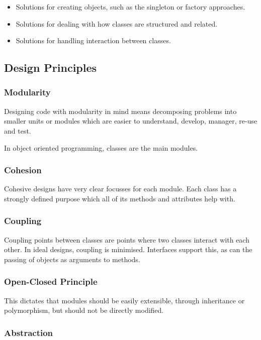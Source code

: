 \documentclass[12pt]{report}
\begin{document}
\begin{flushleft}
\begin{itemize}
    \item Solutions for creating objects, such as the singleton or factory
        approaches.
    \item Solutions for dealing with how classes are structured and related.
    \item Solutions for handling interaction between classes.
\end{itemize}

\subsection*{Design Principles}

\subsubsection*{Modularity}

Designing code with modularity in mind means decomposing problems into smaller
units or modules which are easier to understand, develop, manager, re-use and
test. \par
In object oriented programming, classes are the main modules.

\subsubsection*{Cohesion}

Cohesive designs have very clear focusses for each module. Each class has a
strongly defined purpose which all of its methods and attributes help with.

\subsubsection*{Coupling}

Coupling points between classes are points where two classes interact with each
other. In ideal designs, coupling is minimised. Interfaces support this, as can
the passing of objects as arguments to methods.

\subsubsection*{Open-Closed Principle}

This dictates that modules should be easily extensible, through inheritance or
polymorphism, but should not be directly modified.

\subsubsection*{Abstraction}


\end{flushleft}
\end{document}
